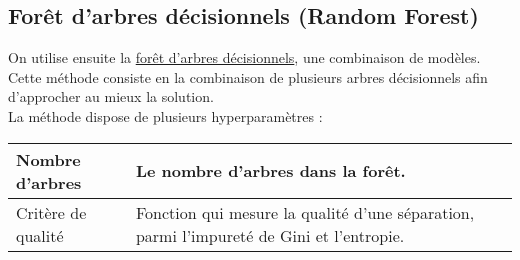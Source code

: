 \subsection{Forêt d'arbres décisionnels (Random Forest)}

On utilise ensuite la \href{https://scikit-learn.org/stable/modules/generated/sklearn.ensemble.RandomForestClassifier.html}{forêt d'arbres décisionnels}, une combinaison de modèles. Cette méthode consiste en la combinaison de plusieurs arbres décisionnels afin d'approcher au mieux la solution.\\

La méthode dispose de plusieurs hyperparamètres :

\noindent
\begin{tabularx}{\textwidth}{|X|X|}
    \hline
    Nombre d'arbres  & Le nombre d'arbres dans la forêt.\\\hline
    Critère de qualité & Fonction qui mesure la qualité d'une séparation, parmi l'impureté de Gini et l'entropie. \\\hline
\end{tabularx}